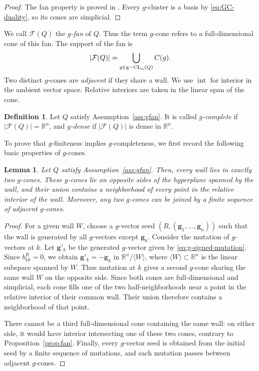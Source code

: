 \documentclass[11pt,reqno]{amsart}
\numberwithin{equation}{section}
\theoremstyle{definition}
\newtheorem{definition}[example]{Definition}
\theoremstyle{plain}
\newtheorem{lemma}[example]{Lemma}
\renewcommand{\int}{\operatorname{int}}
\DeclareMathOperator{\gseed}{{\rm g-CL}}
\begin{document}
	\begin{proof}
		The fan property is proved in \cite[Proposition~6.6]{AC25}. Every $g$-cluster is a basis by \eqref{eq:GC-duality}, so its cones are simplicial.
	\end{proof}
	
	We call $\mathcal F(Q)$ the \emph{$g$-fan} of $Q$. Thus the term $g$-cone refers to a full-dimensional cone of this fan. The support of the fan is
	\[
	|\mathcal F(Q)|=\bigcup_{g\in\gseed_n(Q)}C(g).
	\]
	Two distinct $g$-cones are \emph{adjacent} if they share a wall. We use $\int$ for interior in the ambient vector space. Relative interiors are taken in the linear span of the cone.
	
	\begin{definition}\label{def:complete-dense}
		Let $Q$ satisfy Assumption~\ref{ass:gfan}. It is called \emph{$g$-complete} if $|\mathcal F(Q)|=\mathbb R^{n}$, and \emph{$g$-dense} if $|\mathcal F(Q)|$ is dense in $\mathbb R^{n}$.
	\end{definition}
	
	To prove that $g$-finiteness implies $g$-completeness, we first record the following basic properties of $g$-cones.
	
	\begin{lemma}\label{lem:two-cones}
		Let $Q$ satisfy Assumption~\ref{ass:gfan}. Then, every wall lies in exactly two $g$-cones. These $g$-cones lie on opposite sides of the hyperplane spanned by the wall, and their union contains a neighborhood of every point in the relative interior of the wall. Moreover, any two $g$-cones can be joined by a finite sequence of adjacent $g$-cones.
	\end{lemma}
	
	\begin{proof}
		For a given wall $W$, choose a $g$-vector seed $(R,(\mathbf g_1,\ldots,\mathbf g_n))$ such that the wall is generated by all $g$-vectors except $\mathbf g_k$. Consider the mutation of $g$-vectors at $k$. Let $\mathbf{g}'_k$ be the generated $g$-vector given by \eqref{eq:g-signed-mutation}. Since $b_{kk}^R = 0$, we obtain $\mathbf g'_k = -\mathbf g_k$ in $\mathbb{R}^{n}/\langle W \rangle$, where $\langle W \rangle \subset \mathbb{R}^{n}$ is the linear subspace spanned by $W$. Thus mutation at $k$ gives a second $g$-cone sharing the same wall $W$ on the opposite side. Since both cones are full-dimensional and simplicial, each cone fills one of the two half-neighborhoods near a point in the relative interior of their common wall. Their union therefore contains a neighborhood of that point.
		
		There cannot be a third full-dimensional cone containing the same wall: on either side, it would have interior intersecting one of these two cones, contrary to Proposition~\ref{prop:fan}. Finally, every $g$-vector seed is obtained from the initial seed by a finite sequence of mutations, and each mutation passes between adjacent $g$-cones.
	\end{proof}
	
\end{document}
